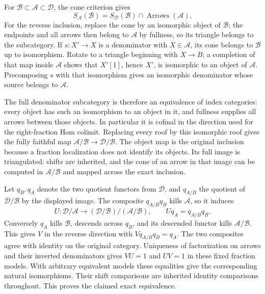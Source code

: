 \documentclass[11pt]{article}
\begin{document}
For \(\mathcal B\subset\mathcal A\subset\mathcal D\),\allowbreak{} the cone criterion gives \[
S_{\mathcal A}(\mathcal B)=S_{\mathcal D}(\mathcal B)
\cap\operatorname{Arrows}(\mathcal A).
\] For the reverse inclusion,\allowbreak{} replace the cone by an isomorphic object of \(\mathcal B\); the endpoints and all arrows then belong to \(\mathcal A\) by fullness,\allowbreak{} so its triangle belongs to the subcategory. If \(s:X'\to X\) is a denominator with \(X\in\mathcal A\),\allowbreak{} its cone belongs to \(\mathcal B\) up to isomorphism. Rotate to a triangle beginning with \(X\to B\); a completion of that map inside \(\mathcal A\) shows that \(X'[1]\),\allowbreak{} hence \(X'\),\allowbreak{} is isomorphic to an object of \(\mathcal A\). Precomposing \(s\) with that isomorphism gives an isomorphic denominator whose source belongs to \(\mathcal A\).

The full denominator subcategory is therefore an equivalence of index categories:\allowbreak{} every object has such an isomorphism to an object in it,\allowbreak{} and fullness supplies all arrows between those objects. In particular it is cofinal in the direction used for the right-fraction Hom colimit. Replacing every roof by this isomorphic roof gives the fully faithful map \(\mathcal A/\mathcal B\to\mathcal D/\mathcal B\). The object map is the original inclusion because a fraction localization does not identify its objects. Its full image is triangulated:\allowbreak{} shifts are inherited,\allowbreak{} and the cone of an arrow in that image can be computed in \(\mathcal A/\mathcal B\) and mapped across the exact inclusion.

Let \(q_B,q_A\) denote the two quotient functors from \(\mathcal D\),\allowbreak{} and \(q_{A/B}\) the quotient of \(\mathcal D/\mathcal B\) by the displayed image. The composite \(q_{A/B}q_B\) kills \(\mathcal A\),\allowbreak{} so it induces \[
U:\mathcal D/\mathcal A\longrightarrow
(\mathcal D/\mathcal B)/(\mathcal A/\mathcal B),\qquad
Uq_A=q_{A/B}q_B.
\] Conversely \(q_A\) kills \(\mathcal B\),\allowbreak{} descends across \(q_B\),\allowbreak{} and its descended functor kills \(\mathcal A/\mathcal B\). This gives \(V\) in the reverse direction with \(Vq_{A/B}q_B=q_A\). The two composites agree with identity on the original category. Uniqueness of factorization on arrows and their inverted denominators gives \(VU=1\) and \(UV=1\) in these fixed fraction models. With arbitrary equivalent models these equalities give the corresponding natural isomorphisms. Their shift comparisons are inherited identity comparisons throughout. This proves the claimed exact equivalence.
\end{document}
